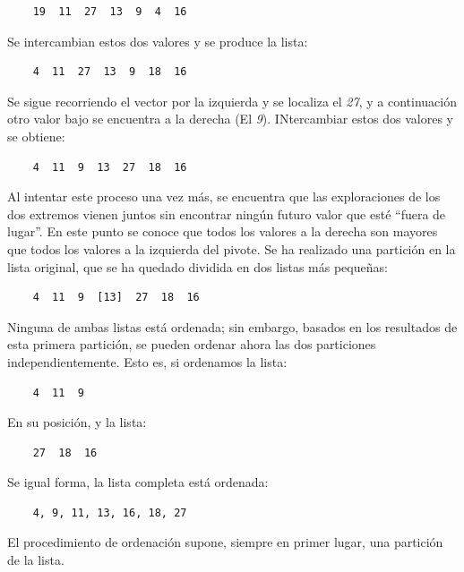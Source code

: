 \documentclass[letterpaper, 12pt]{article}
\begin{document}
  \begin{verbatim}
    19  11  27  13  9  4  16
  \end{verbatim}

  Se intercambian estos dos valores y se produce la lista:

  \begin{verbatim}
    4  11  27  13  9  18  16
  \end{verbatim}

  Se sigue recorriendo el vector por la izquierda y se localiza el \textit{27}, y a continuación otro valor bajo se 
  encuentra a la derecha (El \textit{9}). INtercambiar estos dos valores y se obtiene:

  \begin{verbatim}
    4  11  9  13  27  18  16
  \end{verbatim}

  Al intentar este proceso una vez más, se encuentra que las exploraciones de los dos extremos vienen juntos sin
  encontrar ningún futuro valor que esté ``fuera de lugar”. En este punto se conoce que todos los valores a la derecha
  son mayores que todos los valores a la izquierda del pivote. Se ha realizado una partición en la lista original, que se
  ha quedado dividida en dos listas más pequeñas:

  \begin{verbatim}
    4  11  9  [13]  27  18  16
  \end{verbatim}

  Ninguna de ambas listas está ordenada; sin embargo, basados en los resultados de esta primera partición, se pueden ordenar
  ahora las dos particiones independientemente. Esto es, si ordenamos la lista:

  \begin{verbatim}
    4  11  9
  \end{verbatim}

  En su posición, y la lista:

  \begin{verbatim}
    27  18  16
  \end{verbatim}

  Se igual forma, la lista completa está ordenada:

  \begin{verbatim}
    4, 9, 11, 13, 16, 18, 27
  \end{verbatim}

  El procedimiento de ordenación supone, siempre en primer lugar, una partición de la lista.
\end{document}
